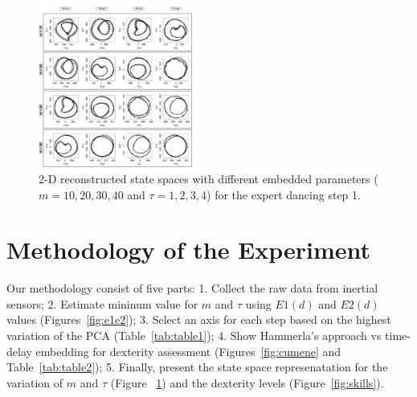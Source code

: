 \documentclass{sigchi}
\begin{document}
\begin{figure}[htbp!] 
\centering    
\includegraphics[width=0.45\textwidth]{takens}
\caption[PA]{2-D reconstructed state spaces with different embedded parameters ($m=10,20,30,40$ and $\tau= 1,2,3,4$)
for the expert dancing step 1.}
\label{fig:takens_problem}
\end{figure}

\section{Methodology of the Experiment}
Our methodology consist of five parts:
1. Collect the raw data from inertial sensors; 
2. Estimate mininum value for $m$ and $\tau$ using $E1(d)$ and $E2(d)$ values (Figures~\ref{fig:e1e2});
3. Select an axis for each step based on the highest variation of the PCA (Table~\ref{tab:table1});
4. Show Hammerla's approach vs time-delay embedding for dexterity assessment (Figures~\ref{fig:cumene} and Table~\ref{tab:table2});
5. Finally, present the state space represenatation for the variation of $m$ and $\tau$ (Figure ~\ref{fig:takens_problem}) and the dexterity levels (Figure~\ref{fig:skills}).


\end{document}
